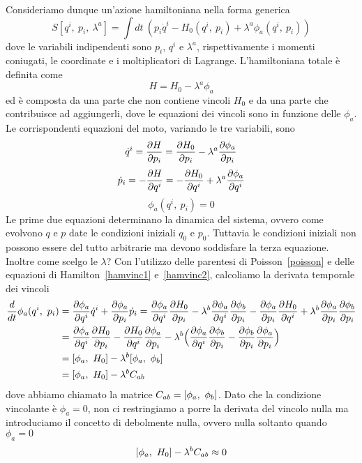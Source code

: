    Consideriamo dunque un'azione hamiltoniana nella forma generica
    \begin{equation} \label{azionevincolo}
        S[q^i,~p_i,~\lambda^a] = \int dt ~ (p_i \dot q^i - H_0(q^i, ~p_i) + \lambda^a \phi_a (q^i, ~p_i))
    \end{equation}
    dove le variabili indipendenti sono $p_i$, $q^i$ e $\lambda^a$, rispettivamente i momenti coniugati, le coordinate e i moltiplicatori di Lagrange. L'hamiltoniana totale è definita come 
    \begin{equation*}
        H = H_0 - \lambda^a \phi_a
    \end{equation*} 
    ed è composta da una parte che non contiene vincoli $H_0$ e da una parte che contribuisce ad aggiungerli, dove le equazioni dei vincoli sono in funzione delle $\phi_a$. Le corrispondenti equazioni del moto, variando le tre variabili, sono
    \begin{equation} \label{hamvinc1}
        \dot q^i = \frac{\partial H}{\partial p_i} = \frac{\partial H_0}{\partial p_i} - \lambda^a \frac{\partial\phi_a}{\partial p_i}
    \end{equation}
    \begin{equation} \label{hamvinc2}
        \dot p_i = - \frac{\partial H}{\partial q^i} = - \frac{\partial H_0}{\partial q^i} + \lambda^a \frac{\partial\phi_a}{\partial q^i}
    \end{equation} 
    \begin{equation} \label{hamvinc3}
        \phi_a(q^i, ~p_i) = 0
    \end{equation}
    Le prime due equazioni determinano la dinamica del sistema, ovvero come evolvono $q$ e $p$ date le condizioni iniziali $q_0$ e $p_0$. Tuttavia le condizioni iniziali non possono essere del tutto arbitrarie ma devono soddisfare la terza equazione. Inoltre come scelgo le $\lambda$? Con l'utilizzo delle parentesi di Poisson~\eqref{poisson} e delle equazioni di Hamilton~\eqref{hamvinc1} e~\eqref{hamvinc2}, calcoliamo la derivata temporale dei vincoli 
    \begin{equation*}
    \begin{aligned}
        \frac{d}{dt} \phi_a(q^i, ~p_i) & = \frac{\partial\phi_a}{\partial q^i} \dot q^i + \frac{\partial\phi_a}{\partial p_i} \dot p_i = \frac{\partial\phi_a}{\partial q^i} \frac{\partial H_0}{\partial p_i} - \lambda^b \frac{\partial\phi_a}{\partial q^i} \frac{\partial\phi_b}{\partial p_i} - \frac{\partial\phi_a}{\partial p_i} \frac{\partial H_0}{\partial q^i} + \lambda^b \frac{\partial\phi_a}{\partial p_i} \frac{\partial\phi_b}{\partial p_i} \\ & = \frac{\partial\phi_a}{\partial q^i} \frac{\partial H_0}{\partial p_i} - \frac{\partial H_0}{\partial q^i} \frac{\partial\phi_a}{\partial p_i} - \lambda^b \Big ( \frac{\partial\phi_a}{\partial q^i} \frac{\partial\phi_b}{\partial p_i} -  \frac{\partial\phi_b}{\partial p_i} \frac{\partial\phi_a}{\partial p_i} \Big) \\ & = [\phi_a, ~H_0] - \lambda^b [\phi_a, ~\phi_b] \\ & = [\phi_a, ~H_0] - \lambda^b C_{ab}
    \end{aligned}
    \end{equation*}
    dove abbiamo chiamato la matrice $C_{ab} = [\phi_a, ~\phi_b]$. Dato che la condizione vincolante è $\phi_a = 0$, non ci restringiamo a porre la derivata del vincolo nulla ma introduciamo il concetto di debolmente nulla, ovvero nulla soltanto quando $\phi_a = 0$
    \begin{equation} \label{vincoli}
        [\phi_a, ~H_0] - \lambda^b C_{ab} \approx 0
    \end{equation}

